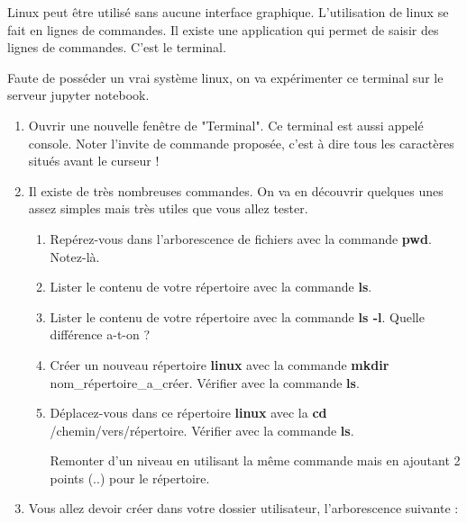 \documentclass[11pt,a4paper]{article}
\begin{document}
Linux peut être utilisé sans aucune interface graphique. L'utilisation de linux se fait en lignes de commandes. Il existe une application qui permet de saisir des lignes de commandes. C'est le terminal.

Faute de posséder un vrai système linux, on va expérimenter ce terminal sur le serveur jupyter notebook.

\begin{enumerate}
\item  Ouvrir une nouvelle fenêtre de "Terminal". Ce terminal est aussi appelé console. Noter l'invite de commande proposée, c'est à dire tous les caractères situés avant le curseur !
\item Il existe de très nombreuses commandes. On va en découvrir quelques unes assez simples mais très utiles que vous allez tester.
\begin{enumerate}
\item Repérez-vous dans l'arborescence de fichiers avec la commande \textbf{pwd}. Notez-là.\vspace{2cm}


\item Lister le contenu de votre répertoire avec la commande \textbf{ls}.\vspace{2cm} 

\item Lister le contenu de votre répertoire avec la commande \textbf{ls -l}. Quelle différence a-t-on ?\vspace{2cm}





\item Créer un nouveau répertoire \textbf{linux} avec la commande \textbf{mkdir} nom\_répertoire\_a\_créer.  Vérifier avec la commande \textbf{ls}.\vspace{2cm}

\item Déplacez-vous dans ce répertoire \textbf{linux} avec la \textbf{cd} /chemin/vers/répertoire. Vérifier avec la commande \textbf{ls}. 

Remonter d'un niveau en utilisant la même commande mais en ajoutant 2 points (..) pour le répertoire. \vspace{2cm}


\end{enumerate}



\item Vous allez devoir créer dans votre dossier utilisateur, l'arborescence suivante :


\end{enumerate}
\end{document}
